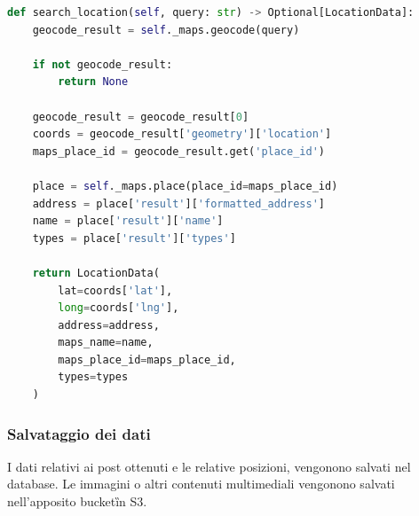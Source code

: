 \begin{lstlisting}[language=Python, caption=Ottenimento informazioni da \textit{Google Maps API}]
def search_location(self, query: str) -> Optional[LocationData]:
    geocode_result = self._maps.geocode(query)

    if not geocode_result:
        return None

    geocode_result = geocode_result[0]
    coords = geocode_result['geometry']['location']
    maps_place_id = geocode_result.get('place_id')

    place = self._maps.place(place_id=maps_place_id)
    address = place['result']['formatted_address']
    name = place['result']['name']
    types = place['result']['types']

    return LocationData(
        lat=coords['lat'],
        long=coords['lng'],
        address=address,
        maps_name=name,
        maps_place_id=maps_place_id,
        types=types
    )
\end{lstlisting}
    

\subsubsection{Salvataggio dei dati}
I dati relativi ai post ottenuti e le relative posizioni, vengonono salvati nel database.
Le immagini o altri contenuti multimediali vengonono salvati nell'apposito bucket\G in S3.
